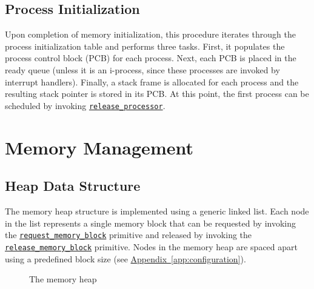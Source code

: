 \documentclass[12pt]{report}
\begin{document}
\subsection{Process Initialization}

Upon completion of memory initialization, this procedure iterates through the process initialization table and performs three tasks. First, it populates the process control block (PCB) for each process. Next, each PCB is placed in the ready queue (unless it is an i-process, since these processes are invoked by interrupt handlers). Finally, a stack frame is allocated for each process and the resulting stack pointer is stored in its PCB. At this point, the first process can be scheduled by invoking \hyperref[alg:releasingtheprocessor]{\texttt{release_processor}}.

\section{Memory Management}

\subsection{Heap Data Structure}

The memory heap structure is implemented using a generic linked list. Each node in the list represents a single memory block that can be requested by invoking the \hyperref[alg:requestingmemoryblocks]{\texttt{request_memory_block}} primitive and released by invoking the \hyperref[alg:releasingmemoryblocks]{\texttt{release_memory_block}} primitive. Nodes in the memory heap are spaced apart using a predefined block size (see \hyperref[app:configuration]{Appendix~\ref*{app:configuration}}).

\begin{figure}[H]

\centering

\caption{The memory heap}

\vspace{1em}


\end{figure}
\end{document}
